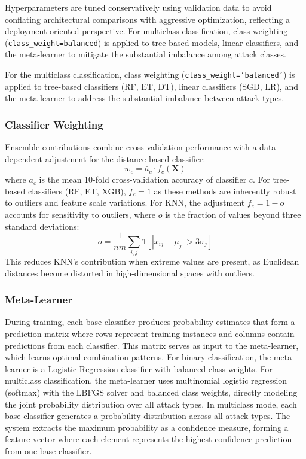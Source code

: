 \documentclass[pdflatex,sn-mathphys-num]{sn-jnl}
\theoremstyle{thmstyleone}%
\theoremstyle{thmstyletwo}%
\theoremstyle{thmstylethree}%
\begin{document}
Hyperparameters are tuned conservatively using validation data to avoid conflating architectural comparisons with aggressive optimization, reflecting a deployment-oriented perspective. For multiclass classification, class weighting (\texttt{class\_weight=balanced}) is applied to tree-based models, linear classifiers, and the meta-learner to mitigate the substantial imbalance among attack classes.

For the multiclass classification, class weighting (\texttt{class\_weight='balanced'}) 
is applied to tree-based classifiers (RF, ET, DT), linear classifiers (SGD, LR), 
and the meta-learner to address the substantial imbalance between attack types.

\subsubsection{Classifier Weighting} Ensemble contributions combine cross-validation performance with a data-dependent adjustment for the distance-based classifier: \begin{equation*} w_c = \bar{a}_c \cdot f_c(\mathbf{X}) \end{equation*} where $\bar{a}_c$ is the mean 10-fold cross-validation accuracy of classifier $c$. For tree-based classifiers (RF, ET, XGB), $f_c = 1$ as these methods are inherently robust to outliers and feature scale variations. For KNN, the adjustment $f_c = 1 - o$ accounts for sensitivity to outliers, where $o$ is the fraction of values beyond three standard deviations: \begin{equation*} o = \frac{1}{nm}\sum_{i,j} \mathds{1}[|x_{ij} - \mu_j| > 3\sigma_j] \end{equation*} This reduces KNN's contribution when extreme values are present, as Euclidean distances become distorted in high-dimensional spaces with outliers.

\subsubsection{Meta-Learner} During training, each base classifier produces probability estimates that form a prediction matrix where rows represent training instances and columns contain predictions from each classifier. This matrix serves as input to the meta-learner, which learns optimal combination patterns. For binary classification, the meta-learner is a Logistic Regression classifier with balanced class weights. For multiclass classification, the meta-learner uses multinomial logistic regression (softmax) with the LBFGS solver and balanced class weights, directly modeling the joint probability distribution over all attack types. In multiclass mode, each base classifier generates a probability distribution across all attack types. The system extracts the maximum probability as a confidence measure, forming a feature vector where each element represents the highest-confidence prediction from one base classifier. 
\end{document}
